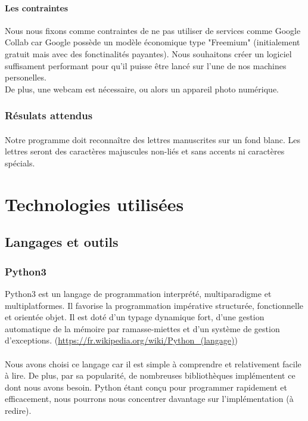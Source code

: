 \documentclass[a4paper]{article}
\begin{document}
				\paragraph{Les contraintes}
					Nous nous fixons comme contraintes de ne pas utiliser de services comme Google Collab car Google possède un modèle économique type "Freemium" (initialement gratuit mais avec des fonctinalités payantes). Nous souhaitons créer un logiciel suffisament performant pour qu'il puisse être lancé sur l'une de nos machines personelles. \\De plus, une webcam est nécessaire, ou alors un appareil photo numérique.
			\subsubsection{Résulats attendus}
				\paragraph{}
					Notre programme doit reconnaître des lettres manuscrites sur un fond blanc. Les lettres seront des caractères majuscules non-liés et sans accents ni caractères spécials.
	\section{Technologies utilisées} 
		\subsection{Langages et outils}
			\subsubsection{Python3}
				Python3 est un langage de programmation interprété, multiparadigme et multiplatformes. Il favorise la programmation impérative structurée, fonctionnelle et orientée objet. Il est doté d'un typage dynamique fort, d'une gestion automatique de la mémoire par ramasse-miettes et d'un système de gestion d'exceptions. (\url{https://fr.wikipedia.org/wiki/Python_(langage)})
				\paragraph{} Nous avons choisi ce langage car il est simple à comprendre et relativement facile à lire. De plus, par sa popularité, de nombreuses bibliothèques implémentent ce dont nous avons besoin. Python étant conçu pour programmer rapidement et efficacement, nous pourrons nous concentrer davantage sur l'implémentation (à redire).
\end{document}
